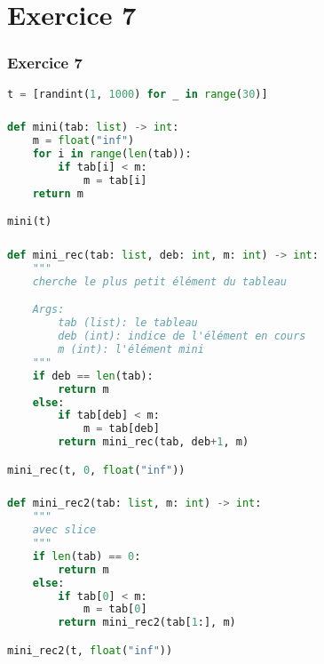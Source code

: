 \documentclass[svgnames,11pt]{beamer}
\begin{document}
\section{Exercice 7}
\begin{frame}[fragile]
    \frametitle{Exercice 7}

\begin{center}
\begin{lstlisting}[language=Python , basicstyle=\ttfamily\small, xleftmargin=2em, xrightmargin=2em]
t = [randint(1, 1000) for _ in range(30)]
\end{lstlisting}
\end{center}

\end{frame}
\begin{frame}[fragile]
    \frametitle{}

\begin{center}
\begin{lstlisting}[language=Python , basicstyle=\ttfamily\small, xleftmargin=2em, xrightmargin=2em]
def mini(tab: list) -> int:
    m = float("inf")
    for i in range(len(tab)):
        if tab[i] < m:
            m = tab[i]
    return m

mini(t)
\end{lstlisting}
\end{center}

\end{frame}
\begin{frame}[fragile]
    \frametitle{}

\begin{center}
\begin{lstlisting}[language=Python , basicstyle=\ttfamily\small, xleftmargin=1em, xrightmargin=1em]
def mini_rec(tab: list, deb: int, m: int) -> int:
    """
    cherche le plus petit élément du tableau

    Args:
        tab (list): le tableau
        deb (int): indice de l'élément en cours
        m (int): l'élément mini
    """
    if deb == len(tab):
        return m
    else:
        if tab[deb] < m:
            m = tab[deb]
        return mini_rec(tab, deb+1, m)

mini_rec(t, 0, float("inf"))
\end{lstlisting}
\end{center}

\end{frame}
\begin{frame}[fragile]
    \frametitle{}

\begin{center}
\begin{lstlisting}[language=Python , basicstyle=\ttfamily\small, xleftmargin=2em, xrightmargin=2em]
def mini_rec2(tab: list, m: int) -> int:
    """
    avec slice
    """
    if len(tab) == 0:
        return m
    else:
        if tab[0] < m:
            m = tab[0]
        return mini_rec2(tab[1:], m)

mini_rec2(t, float("inf"))
\end{lstlisting}
\label{CODE}
\end{center}

\end{frame}
\end{document}
